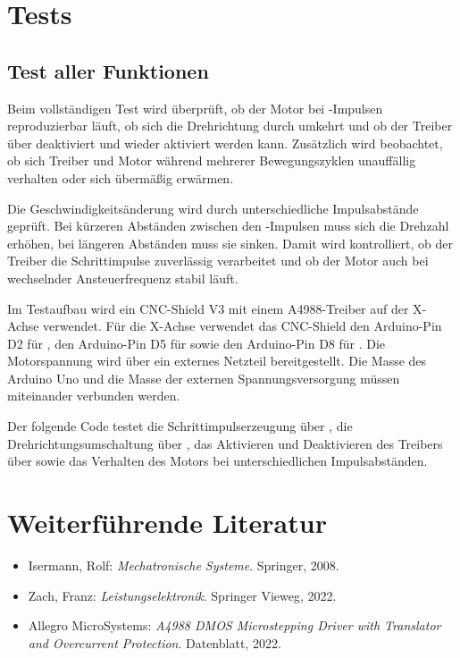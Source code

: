\section{Tests}


\subsection{Test aller Funktionen}

Beim vollständigen Test wird überprüft, ob der Motor bei -Impulsen reproduzierbar läuft, ob sich die Drehrichtung durch  umkehrt und ob der Treiber über  deaktiviert und wieder aktiviert werden kann.
Zusätzlich wird beobachtet, ob sich Treiber und Motor während mehrerer Bewegungszyklen unauffällig verhalten oder sich übermäßig erwärmen.

Die Geschwindigkeitsänderung wird durch unterschiedliche Impulsabstände geprüft.
Bei kürzeren Abständen zwischen den -Impulsen muss sich die Drehzahl erhöhen, bei längeren Abständen muss sie sinken.
Damit wird kontrolliert, ob der Treiber die Schrittimpulse zuverlässig verarbeitet und ob der Motor auch bei wechselnder Ansteuerfrequenz stabil läuft.

Im Testaufbau wird ein CNC-Shield V3 mit einem A4988-Treiber auf der X-Achse verwendet.
Für die X-Achse verwendet das CNC-Shield den Arduino-Pin D2 für , den Arduino-Pin D5 für  sowie den Arduino-Pin D8 für .
Die Motorspannung wird über ein externes Netzteil bereitgestellt.
Die Masse des Arduino Uno und die Masse der externen Spannungsversorgung müssen miteinander verbunden werden.

Der folgende Code testet die Schrittimpulserzeugung über , die Drehrichtungsumschaltung über , das Aktivieren und Deaktivieren des Treibers über  sowie das Verhalten des Motors bei unterschiedlichen Impulsabständen.

\begin{code}[H]
	\label{Code:A4988DriverTest}
\end{code}

\section{Weiterführende Literatur}

\begin{itemize}
	\item Isermann, Rolf: \textit{Mechatronische Systeme}. Springer, 2008. \cite{Isermann:2008}
	\item Zach, Franz: \textit{Leistungselektronik}. Springer Vieweg, 2022. \cite{Zach:2022}
	\item Allegro MicroSystems: \textit{A4988 DMOS Microstepping Driver with Translator and Overcurrent Protection}. Datenblatt, 2022. \cite{Allegro:A4988}
\end{itemize}